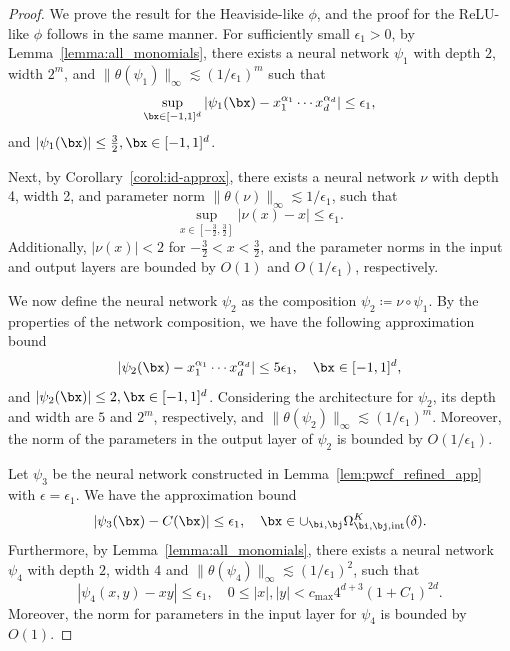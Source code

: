 \documentclass[11pt]{article}
\begin{document}
\begin{proof}
    We prove the result for the Heaviside-like $\phi$, and the proof for the ReLU-like $\phi$ follows in the same manner. For sufficiently small $\epsilon_1>0$, by Lemma~\ref{lemma:all_monomials}, there exists a neural network $\psi_1$ with depth $2$, width $2^{m}$, and $\|\theta(\psi_1)\|_{\infty}\lesssim (1 / \epsilon_1)^m$ such that 
    \begin{equation*}
        \sup_{\bx \in [-1,1]^d} |\psi_1(\bx) - x_1^{\alpha_1} \cdots x_d^{\alpha_d}| \leq \epsilon_1,
    \end{equation*}
    and $|\psi_1(\bx)| \leq \frac{3}{2}, \bx \in [-1,1]^d$.     
    
    Next, by Corollary~\ref{corol:id-approx}, there exists a neural network $\nu$ with depth 4, width 2, and parameter norm $\|\theta(\nu)\|_{\infty} \lesssim 1/\epsilon_1$, such that
    \begin{equation*}
        \sup_{x \in [-\frac{3}{2}, \frac{3}{2}]} |\nu(x) - x| \leq \epsilon_1.
    \end{equation*}
    Additionally, $|\nu(x)| < 2$ for $-\frac{3}{2} < x < \frac{3}{2}$, and the parameter norms in the input and output layers are bounded by $O(1)$ and $O(1/\epsilon_1)$, respectively.
    

    We now define the neural network $\psi_2$ as the composition $\psi_2 \coloneqq  \nu \circ \psi_1$.
    By the properties of the network composition, we have the following approximation bound
    \begin{equation*}
        \left| \psi_2(\bx) - x_1^{\alpha_1} \cdots x_d^{\alpha_d}\right| \leq 5 \epsilon_1, \quad \bx \in [-1,1]^d,
    \end{equation*}
    and $|\psi_2(\bx)| \leq 2, \bx \in [-1,1]^d$. Considering the architecture for $\psi_2$, its depth and width are $5$ and $2^m$, respectively, and $\|\theta(\psi_2)\|_{\infty} \lesssim (1 / \epsilon_1)^m$. Moreover, the norm of the parameters in the output layer of $\psi_2$ is bounded by $O(1 / \epsilon_1)$.


    Let $\psi_3$ be the neural network constructed in Lemma~\ref{lem:pwcf_refined_app} with $\epsilon = \epsilon_1$. We have the approximation bound
    \begin{equation*}
        |\psi_3(\bx) - C(\bx)| \leq \epsilon_1, \quad \bx \in \cup_{\bi, \bj} \Omega_{\bi, \bj, \mathrm{int}}^{K}(\delta).
    \end{equation*}
    Furthermore, by Lemma~\ref{lemma:all_monomials}, there exists a neural network $\psi_4$  with depth $2$, width $4$ and $\|\theta(\psi_4)\|_{\infty} \lesssim (1 / \epsilon_1)^2$, such that 
    \begin{equation*}
        |\psi_4(x, y) - x y | \leq \epsilon_1, \quad 0 \leq |x|, |y| < c_{\max} 4^{d+3} (1+C_1)^{2d}.
    \end{equation*}
    Moreover, the norm for parameters in the input layer for $\psi_4$ is bounded by $O(1)$. 



\end{proof}
\end{document}
